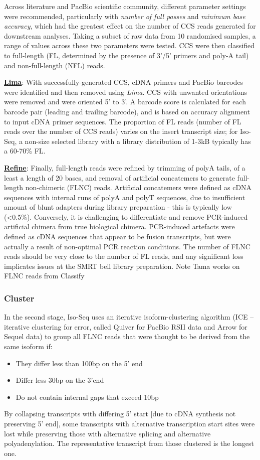 Across literature and PacBio scientific community, different parameter settings were recommended, particularly with \textit{number of full passes} and \textit{minimum base accuracy}, which had the greatest effect on the number of CCS reads generated for downstream analyses. Taking a subset of raw data from 10 randomised samples, a range of values across these two parameters were tested. CCS were then classified to full-length (FL, determined by the presence of 3'/5' primers and poly-A tail) and non-full-length (NFL) reads. 

\uline{\textbf{Lima}}: With successfully-generated CCS, cDNA primers and PacBio barcodes were identified and then removed using \textit{Lima}. CCS with unwanted orientations were removed and were oriented 5’ to 3’. A barcode score is calculated for each barcode pair (leading and trailing barcode), and is based on accuracy alignment to input cDNA primer sequences. The proportion of FL reads (number of FL reads over the number of CCS reads) varies on the insert transcript size; for Iso-Seq, a non-size selected library with a library distribution of 1-3kB typically has a 60-70\% FL. 

\uline{\textbf{Refine}}: Finally, full-length reads were refined by trimming of polyA tails, of a least a length of 20 bases, and removal of artificial concatemers to generate full-length non-chimeric (FLNC) reads. Artificial concatemers were defined as cDNA sequences with internal runs of polyA and polyT sequences, due to insufficient amount of blunt adapters during library preparation - this is typically low (<0.5\%). Conversely, it is challenging to differentiate and remove PCR-induced artificial chimera from true biological chimera. PCR-induced artefacts were defined as cDNA sequences that appear to be fusion transcripts, but were actually a result of non-optimal PCR reaction conditions. The number of FLNC reads should be very close to the number of FL reads, and any significant loss implicates issues at the SMRT bell library preparation.
Note Tama works on FLNC reads from Classify 

\subsubsection{Cluster}
In the second stage, Iso-Seq uses an iterative isoform-clustering algorithm (ICE – iterative clustering for error, called Quiver for PacBio RSII data and Arrow for Sequel data) to group all FLNC reads that were thought to be derived from the same isoform if: 
\begin{itemize}
	\item They differ less than 100bp on the 5’ end 
	\item Differ less 30bp on the 3’end 
	\item Do not contain internal gaps that exceed 10bp
\end{itemize}
By collapsing transcripts with differing 5' start [due to cDNA synthesis not preserving 5' end], some transcripts with alternative transcription start sites were lost while preserving those with alternative splicing and alternative polyadenylation. The representative transcript from those clustered is the longest one. 

